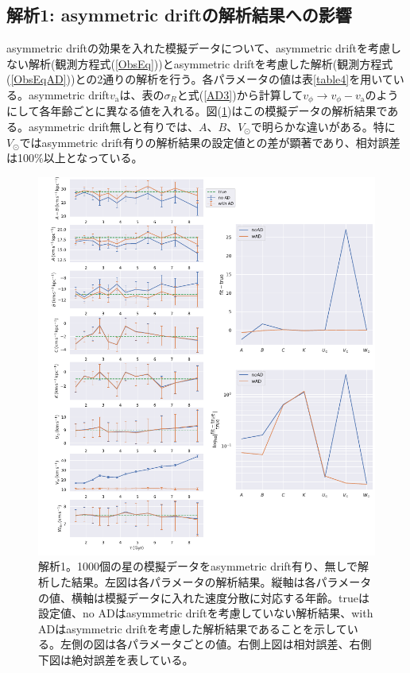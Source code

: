 
\subsection{解析1: asymmetric driftの解析結果への影響}
asymmetric driftの効果を入れた模擬データについて、asymmetric driftを考慮しない解析(観測方程式(\ref{ObsEq}))とasymmetric driftを考慮した解析(観測方程式(\ref{ObsEqAD}))との2通りの解析を行う。各パラメータの値は表\ref{table4}を用いている。asymmetric drift$v_{\mathrm{a}}$は、表の$\sigma_R$と式(\ref{AD3})から計算して$v_{\phi}\to v_{\phi}-v_{\mathrm{a}}$のようにして各年齢ごとに異なる値を入れる。図(\ref{fig:Mock_AD})はこの模擬データの解析結果である。asymmetric drift無しと有りでは、$A、B、V_{\odot}$で明らかな違いがある。特に$V_{\odot}$ではasymmetric drift有りの解析結果の設定値との差が顕著であり、相対誤差は100\%以上となっている。

\begin{figure}[htbp]
	\centering
	\includegraphics[width=15cm]{fig/Mock_AD.pdf}
	\caption{解析1。1000個の星の模擬データをasymmetric drift有り、無しで解析した結果。左図は各パラメータの解析結果。縦軸は各パラメータの値、横軸は模擬データに入れた速度分散に対応する年齢。trueは設定値、no ADはasymmetric driftを考慮していない解析結果、with ADはasymmetric driftを考慮した解析結果であることを示している。左側の図は各パラメータごとの値。右側上図は相対誤差、右側下図は絶対誤差を表している。} \label{fig:Mock_AD}
\end{figure}


